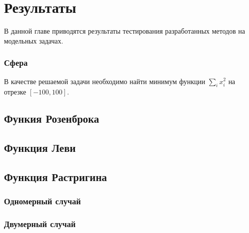 \chapter{Результаты}
\label{chapter_results}

В данной главе приводятся результаты тестирования разработанных методов на модельных задачах.

\subsection{Сфера}

В качестве решаемой задачи необходимо найти минимум функции $\sum\limits_i{x_i^2}$ на отрезке $[-100, 100]$.


\section{Функия Розенброка}

\section{Функция Леви}


\section{Функция Растригина}

\subsection{Одномерный случай}

\subsection{Двумерный случай}